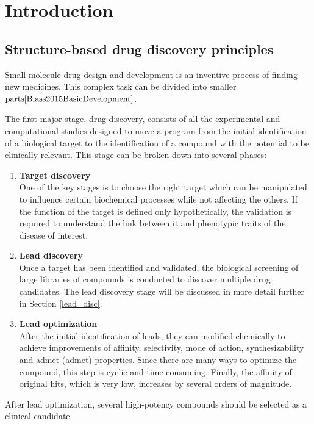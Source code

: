 \chapter{Introduction}
\section{Structure-based drug discovery principles}
Small molecule drug design and development is an inventive process of finding new 
medicines.
This complex task can be divided into smaller $\text{parts}{\cite{Blass2015BasicDevelopment}}$. 

The first major stage, drug discovery, consists of all the experimental and computational 
studies designed to move a program from the initial identification of a biological 
target to the identification of a compound with the potential to be clinically relevant.
This stage can be broken down into several phases:
\begin{enumerate}
    \item \textbf{Target discovery}\\
    One of the key stages is to choose the right target which can be manipulated 
to influence certain biochemical processes while not affecting the others.
    If the function of the target is defined only hypothetically, the validation 
is required to understand the link between it and phenotypic traits of the disease 
of interest.
    \item \textbf{Lead discovery}\\
    Once a target has been identified and validated, the biological screening of 
large libraries of compounds is conducted to discover multiple drug candidates.
    The lead discovery stage will be discussed in more detail further in Section 
\ref{lead_disc}.
    \item \textbf{Lead optimization}\\
    After the initial identification of leads, they can modified chemically to achieve 
improvements of  affinity, selectivity, mode of action, synthesizability and \acrshort{admet} 
(\acrlong{admet})-properties.
    Since there are many ways to optimize the compound, this step is cyclic and 
time-consuming. Finally, the affinity of \glqq original hits\grqq, which is very 
low, increases by several orders of magnitude.
\end{enumerate}

After lead optimization, several high-potency compounds should be selected as a 
clinical candidate.

